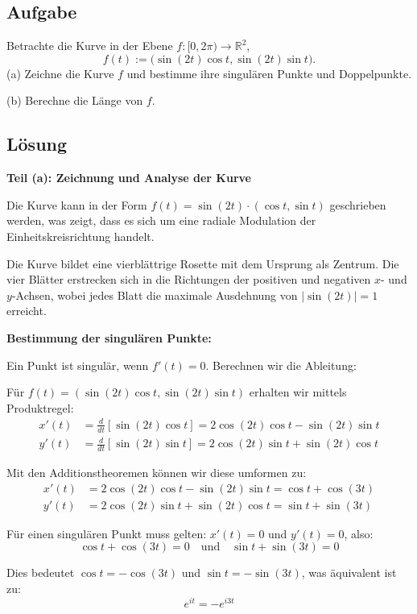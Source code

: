 \documentclass{article}
\newcommand{\R}{\mathbb{R}}
\begin{document}
\subsection*{Aufgabe}
Betrachte die Kurve in der Ebene $f:[0,2\pi)\to\R^2$, 
$$
   f(t) := \bigl(\sin(2t)\cos t,\sin(2t)\sin t\bigr).
$$
(a) Zeichne die Kurve $f$ und bestimme ihre singulären Punkte und
Doppelpunkte. 

(b) Berechne die Länge von $f$. 

\subsection*{Lösung}

\textbf{Teil (a): Zeichnung und Analyse der Kurve}

Die Kurve kann in der Form $f(t) = \sin(2t) \cdot (\cos t, \sin t)$ geschrieben werden, was zeigt, dass es sich um eine radiale Modulation der Einheitskreisrichtung handelt.

Die Kurve bildet eine vierblättrige Rosette mit dem Ursprung als Zentrum. Die vier Blätter erstrecken sich in die Richtungen der positiven und negativen $x$- und $y$-Achsen, wobei jedes Blatt die maximale Ausdehnung von $|\sin(2t)| = 1$ erreicht.

\textbf{Bestimmung der singulären Punkte:}

Ein Punkt ist singulär, wenn $f'(t) = 0$. Berechnen wir die Ableitung:

Für $f(t) = (\sin(2t)\cos t, \sin(2t)\sin t)$ erhalten wir mittels Produktregel:
\begin{align}
x'(t) &= \frac{d}{dt}[\sin(2t)\cos t] = 2\cos(2t)\cos t - \sin(2t)\sin t\\
y'(t) &= \frac{d}{dt}[\sin(2t)\sin t] = 2\cos(2t)\sin t + \sin(2t)\cos t
\end{align}

Mit den Additionstheoremen können wir diese umformen zu:
\begin{align}
x'(t) &= 2\cos(2t)\cos t - \sin(2t)\sin t = \cos t + \cos(3t)\\
y'(t) &= 2\cos(2t)\sin t + \sin(2t)\cos t = \sin t + \sin(3t)
\end{align}

Für einen singulären Punkt muss gelten: $x'(t) = 0$ und $y'(t) = 0$, also:
$$\cos t + \cos(3t) = 0 \quad \text{und} \quad \sin t + \sin(3t) = 0$$

Dies bedeutet $\cos t = -\cos(3t)$ und $\sin t = -\sin(3t)$, was äquivalent ist zu:
$$e^{it} = -e^{i3t}$$
\end{document}

